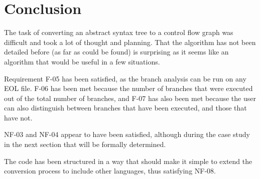 \section{Conclusion}

The task of converting an abstract syntax tree to a control flow graph was difficult and took a lot of thought and planning. That the algorithm has not been detailed before (as far as could be found) is surprising as it seems like an algorithm that would be useful in a few situations.

Requirement F-05 has been satisfied, as the branch analysis can be run on any EOL file. F-06 has been met because the number of branches that were executed out of the total number of branches, and F-07 has also been met because the user can also distinguish between branches that have been executed, and those that have not.

NF-03 and NF-04 appear to have been satisfied, although during the case study in the next section that will be formally determined.

The code has been structured in a way that should make it simple to extend the conversion process to include other languages, thus satisfying NF-08.

